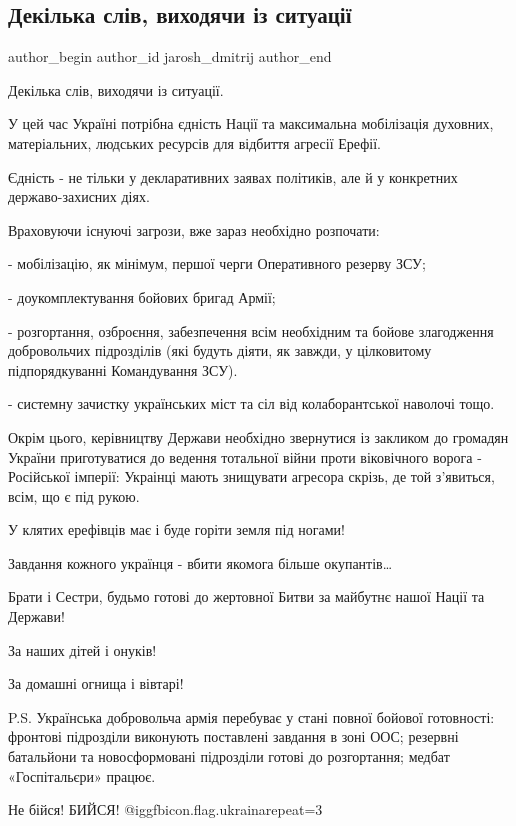 
 
 
 
 
 
\subsection{Декілька слів, виходячи із ситуації}
\label{sec:20_02_2022.fb.jarosh_dmitrij.1.dekilka_sliv}
 
\ifcmt
 author_begin
   author_id jarosh_dmitrij
 author_end
\fi

Декілька слів, виходячи із ситуації.

У цей час Україні потрібна єдність Нації та максимальна мобілізація духовних,
матеріальних, людських ресурсів для відбиття агресії Ерефії.

Єдність - не тільки у декларативних заявах політиків, але й у конкретних
державо-захисних діях.

Враховуючи існуючі загрози, вже зараз необхідно розпочати:

-  мобілізацію, як мінімум, першої черги Оперативного резерву ЗСУ; 

- доукомплектування бойових бригад Армії; 

- розгортання, озброєння, забезпечення всім необхідним та бойове злагодження
добровольчих підрозділів (які будуть діяти, як завжди, у цілковитому
підпорядкуванні Командування ЗСУ).

- системну зачистку українських міст та сіл від колаборантської наволочі тощо.

Окрім цього, керівництву Держави необхідно звернутися із закликом до громадян
України приготуватися до ведення тотальної війни проти віковічного ворога -
Російської імперії: Украінці мають знищувати агресора скрізь, де той з’явиться,
всім, що є під рукою. 

У клятих ерефівців має і буде горіти земля під ногами!

Завдання кожного українця - вбити якомога більше окупантів…

Брати і Сестри, будьмо готові до жертовної Битви за майбутнє нашої Нації та
Держави!

За наших дітей і онуків!

За домашні огнища і вівтарі!

P.S. Українська добровольча армія перебуває у стані повної бойової готовності:
фронтові підрозділи виконують поставлені завдання в зоні ООС; резервні
батальйони та новосформовані підрозділи готові до розгортання; медбат
«Госпітальєри» працює. 

Не бійся! БИЙСЯ! @igg{fbicon.flag.ukraina}{repeat=3}
